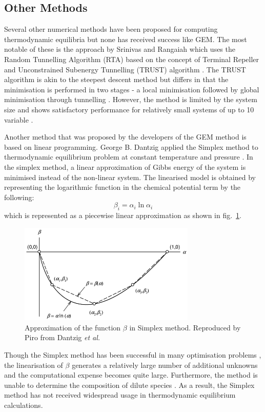 	\subsection{Other Methods}
	Several other numerical methods have been proposed for computing thermodynamic equilibria but none has received success like GEM. The most notable of these is the approach by Srinivas and Rangaiah which uses  the Random Tunnelling Algorithm (RTA) based on the concept of Terminal Repeller and Unconstrained Subenergy Tunnelling (TRUST) algorithm \cite{Srinivas06}. The TRUST algorithm is akin to the steepest descent method but differs in that the minimisation is performed in two stages - a local minimisation followed by global minimisation through tunnelling \cite{Nocedal06}.  However, the method is limited by the system size and shows satisfactory performance for relatively small systems of up to 10 variable \cite{Nocedal06}.

	Another method that was proposed by the developers of the GEM method is based on linear programming. George B. Dantzig applied the Simplex method to thermodynamic equilibrium problem at constant temperature and pressure \cite{Dantzig:1957aa,Dantzig:1958aa}. In the simplex method, a linear approximation of Gibbs energy of the system is minimised instead of the non-linear system. The linearised model is obtained by representing the logarithmic function in the chemical potential term by the following:
	\begin{equation}
		\beta_i = \alpha_i \ln \alpha_i
	\end{equation}
 which is represented as a piecewise linear approximation as shown in fig.~\ref{fig:simplex}.
 	\begin{figure}[htbp]
		\centering
		\includegraphics[width=0.75\textwidth]{figures/Simplex}
		\caption{Approximation of the function $\beta$ in Simplex method. Reproduced by Piro \cite{Piro11b} from Dantzig \textit{et al.} \cite{Dantzig:1957aa}}
		\label{fig:simplex}
	\end{figure}
	Though the Simplex method has been successful in many optimisation problems \cite{Dantzig:2016aa}, the linearisation of $\beta$ generates a relatively large number of additional unknowns and the computational expense becomes quite large. Furthermore, the method is unable to determine the composition of dilute species \cite{vanZeggeren11}. As a result, the Simplex method has not received widespread usage in thermodynamic equilibrium calculations.


